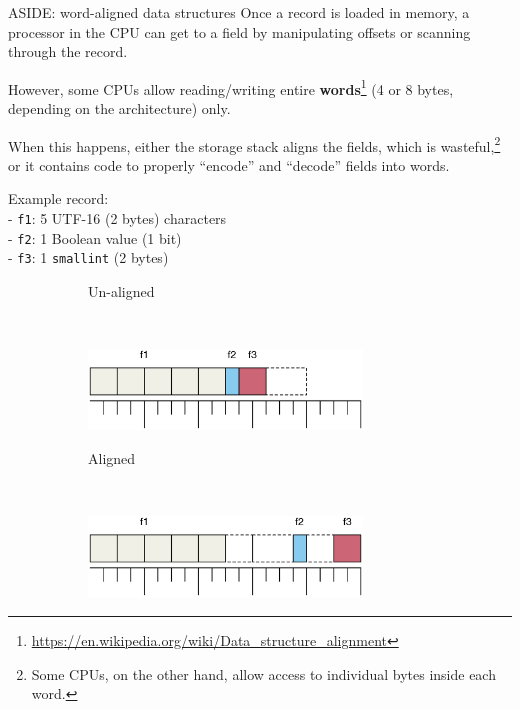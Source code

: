 %
%
\begin{frame}{ASIDE: word-aligned data structures}
Once a record is loaded in memory, a processor in the CPU can get to a field by manipulating offsets or scanning through the record.

However, some CPUs allow reading/writing entire \textbf{words}\footnote{\url{https://en.wikipedia.org/wiki/Data_structure_alignment}} (4 or 8 bytes, depending on the architecture) only.

When this happens, either the storage stack aligns the fields, which is wasteful,\footnote{Some CPUs, on the other hand, allow access to individual bytes inside each word.} or it contains code to properly ``encode'' and ``decode'' fields into words.
\end{frame}

%
%
\begin{frame}

Example record:\\
- \texttt{f1}: 5 UTF-16 (2 bytes) characters\\
- \texttt{f2}: 1 Boolean value (1 bit)\\
- \texttt{f3}: 1 \texttt{smallint} (2 bytes)

\begin{figure}
\begin{subfigure}{0.25\textwidth}
\hfill Un-aligned 
\end{subfigure}
~~
\begin{subfigure}{0.7\textwidth}
\includegraphics[width=0.8\textwidth]{figures/record_unaligned}
\end{subfigure}
\end{figure}

\begin{figure}
\begin{subfigure}{0.25\textwidth}
\hfill Aligned 
\end{subfigure}
~~
\begin{subfigure}{0.7\textwidth}
\includegraphics[width=0.8\textwidth]{figures/record_aligned}
\end{subfigure}
\end{figure}

\end{frame}


